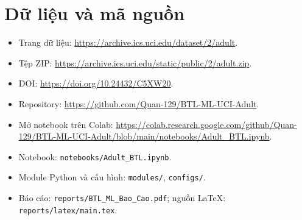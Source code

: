 \section{Dữ liệu và mã nguồn}
\label{sec:A_4}
\begin{itemize}
\item Trang dữ liệu: \url{https://archive.ics.uci.edu/dataset/2/adult}.
\item Tệp ZIP: \url{https://archive.ics.uci.edu/static/public/2/adult.zip}.
\item DOI: \url{https://doi.org/10.24432/C5XW20}.
\item Repository: \url{https://github.com/Quan-129/BTL-ML-UCI-Adult}.
\item Mở notebook trên Colab: \url{https://colab.research.google.com/github/Quan-129/BTL-ML-UCI-Adult/blob/main/notebooks/Adult_BTL.ipynb}.
\item Notebook: \texttt{notebooks/Adult\_BTL.ipynb}.
\item Module Python và cấu hình: \texttt{modules/}, \texttt{configs/}.
\item Báo cáo: \texttt{reports/BTL\_ML\_Bao\_Cao.pdf}; nguồn LaTeX: \texttt{reports/latex/main.tex}.
\end{itemize}
